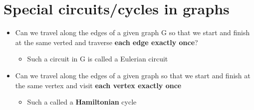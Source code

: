 \documentclass{article}[18pt]
\begin{document}
\section{Special circuits/cycles in graphs}
\begin{itemize}
	\item Can we travel along the edges of a given graph G so that we start and finish at the same verted and traverse \textbf{each edge exactly once}?
	\begin{itemize}
		\item Such a circuit in G is called a Eulerian circuit
	\end{itemize}
	\item Can we travel along the edges of a given graph so that we start and finish at the same vertex and visit \textbf{each vertex exactly once}
	\begin{itemize}
		\item Such a called a \textbf{Hamiltonian} cycle
	\end{itemize}
\end{itemize}
\end{document}
